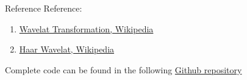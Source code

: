 \documentclass{beamer}
\begin{document}
\begin{frame}{Reference}
	Reference: 
	\begin{enumerate}
		\item \href{https://en.wikipedia.org/wiki/Wavelet_transform}{Wavelat Transformation, Wikipedia} 
		\item \href{https://en.wikipedia.org/wiki/Haar_wavelet}{Haar Wavelat, Wikipedia} 
	\end{enumerate}

	\medskip \medskip

	Complete code can be found in the following \href{https://github.com/zlt-0503/Wavelet-Compression}{Github repository} 
\end{frame}

\thankframe
\end{document}
